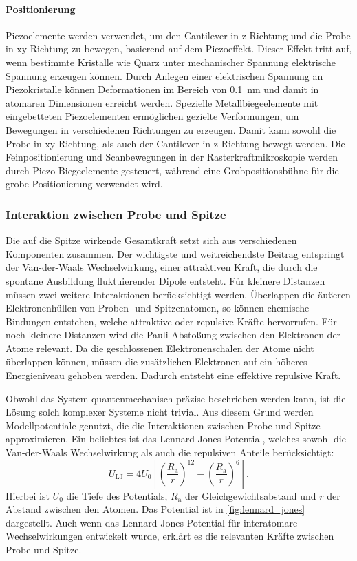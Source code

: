 \paragraph{Positionierung}
Piezoelemente werden verwendet, um den Cantilever in $\mathrm{z}$-Richtung und die Probe in $\mathrm{xy}$-Richtung zu
bewegen, basierend auf dem Piezoeffekt.
Dieser Effekt tritt auf, wenn bestimmte Kristalle wie Quarz unter mechanischer Spannung elektrische Spannung erzeugen
können.
Durch Anlegen einer elektrischen Spannung an Piezokristalle können Deformationen im Bereich von \qty{0.1}{\nano\meter}
und damit in atomaren Dimensionen erreicht werden.
Spezielle Metallbiegeelemente mit eingebetteten Piezoelementen ermöglichen gezielte Verformungen, um Bewegungen
in verschiedenen Richtungen zu erzeugen.
Damit kann sowohl die Probe in $\mathrm{xy}$-Richtung, als auch der Cantilever in $\mathrm{z}$-Richtung bewegt werden.
Die Feinpositionierung und Scanbewegungen in der Rasterkraftmikroskopie werden durch Piezo-Biegeelemente gesteuert,
während eine Grobpositionsbühne für die grobe Positionierung verwendet wird.

\subsubsection{Interaktion zwischen Probe und Spitze}
Die auf die Spitze wirkende Gesamtkraft setzt sich aus verschiedenen Komponenten zusammen.
Der wichtigste und weitreichendste Beitrag entspringt der Van-der-Waals Wechselwirkung, einer attraktiven Kraft,
die durch die spontane Ausbildung fluktuierender Dipole entsteht.
Für kleinere Distanzen müssen zwei weitere Interaktionen berücksichtigt werden.
Überlappen die äußeren Elektronenhüllen von Proben- und Spitzenatomen, so können chemische Bindungen entstehen, welche
attraktive oder repulsive Kräfte hervorrufen.
Für noch kleinere Distanzen wird die Pauli-Abstoßung zwischen den Elektronen der Atome relevant.
Da die geschlossenen Elektronenschalen der Atome nicht überlappen können, müssen die zusätzlichen Elektronen auf ein
höheres Energieniveau gehoben werden.
Dadurch entsteht eine effektive repulsive Kraft.

Obwohl das System quantenmechanisch präzise beschrieben werden kann, ist die Lösung solch komplexer Systeme
nicht trivial.
Aus diesem Grund werden Modellpotentiale genutzt, die die Interaktionen zwischen Probe und Spitze approximieren.
Ein beliebtes ist das Lennard-Jones-Potential, welches sowohl die Van-der-Waals Wechselwirkung als auch die repulsiven
Anteile berücksichtigt:
\begin{equation}
    U_{\mathrm{LJ}}=4U_{0}\left[ \left( \frac{R_{\mathrm{a}}}{r} \right)^{12} -\left( \frac{R_{\mathrm{a}}}{r}
    \right)^{6}\right].
    \label{eq:lennard_jones}
\end{equation}
Hierbei ist $U_{0}$ die Tiefe des Potentials, $R_{\mathrm{a}}$ der Gleichgewichtsabstand und $r$ der Abstand zwischen
den Atomen.
Das Potential ist in \cref{fig:lennard_jones} dargestellt.
Auch wenn das Lennard-Jones-Potential für interatomare Wechselwirkungen entwickelt wurde, erklärt es die relevanten
Kräfte zwischen Probe und Spitze.

